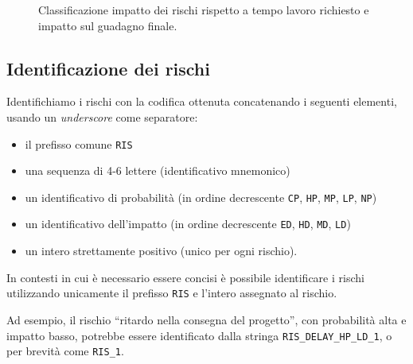 \documentclass[10pt]{softeng} %
\newcommand{\code}[1]{\texttt{#1}}
\begin{document}
\begin{figure}
	\caption{Classificazione impatto dei rischi rispetto a tempo lavoro richiesto e impatto sul guadagno finale.}
	\label{fig:rappresentazione_impatto}
\end{figure}

\subsection{Identificazione dei rischi}

Identifichiamo i rischi con la codifica ottenuta concatenando i seguenti elementi, usando un \emph{underscore} come separatore:
\begin{itemize}
	\item il prefisso comune \code{RIS}
	\item una sequenza di 4-6 lettere (identificativo mnemonico)
	\item un identificativo di probabilit\`a (in ordine decrescente \code{CP}, \code{HP}, \code{MP}, \code{LP}, \code{NP})
	\item un identificativo dell'impatto (in ordine decrescente \code{ED}, \code{HD}, \code{MD}, \code{LD})
	\item un intero strettamente positivo (unico per ogni rischio).
\end{itemize}
In contesti in cui \`e necessario essere concisi \`e possibile identificare i rischi utilizzando unicamente il prefisso \code{RIS} e l'intero assegnato al rischio.

Ad esempio, il rischio ``ritardo nella consegna del progetto'', con probabilit\`a alta e impatto basso, potrebbe essere identificato dalla stringa \code{RIS\_DELAY\_HP\_LD\_1}, o per brevit\`a come \code{RIS\_1}.
\end{document}
